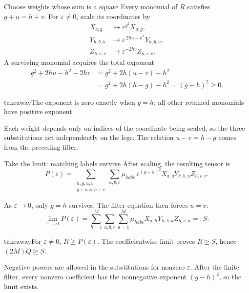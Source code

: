 \documentclass[aspectratio=169,11pt]{beamer}
\newcommand{\degen}{\unrhd}
\newcommand{\source}[1]{\vfill\par{\fontsize{7.5}{9}\selectfont\color{muted}#1\par}}
\newcommand{\takeaway}[1]{\begin{beamercolorbox}[sep=0.65em,wd=\linewidth]{takeaway}#1\end{beamercolorbox}}
\begin{document}
\begin{frame}{Choose weights whose sum is a square}
  Every monomial of $R$ satisfies $g+u=h+v$.
  For $\varepsilon\ne0$, scale its coordinates by
  \[
  \begin{aligned}
    X_{a,g}&\longmapsto\varepsilon^{g^2}X_{a,g},\\
    Y_{h,b,u}&\longmapsto\varepsilon^{\,2hu-h^2}Y_{h,b,u},\\
    Z_{h,c,v}&\longmapsto\varepsilon^{-2hv}Z_{h,c,v}.
  \end{aligned}
  \]
  A surviving monomial acquires the total exponent
  \[
  \begin{aligned}
    g^2+2hu-h^2-2hv
      &=g^2+2h(u-v)-h^2\\
      &=g^2+2h(h-g)-h^2=(g-h)^2\ge0.
  \end{aligned}
  \]
  \takeaway{The exponent is zero exactly when $g=h$;
    all other retained monomials have positive exponent.}
  \source{Each weight depends only on indices of the coordinate being scaled,
  so the three substitutions act independently on the legs.
  The relation $u-v=h-g$ comes from the preceding filter.}
\end{frame}

\begin{frame}{Take the limit: matching labels survive}
  After scaling, the resulting tensor is
  \[
    P(\varepsilon)=
      \sum_{\substack{h,g,u,v\\g+u=h+v}}\sum_{a,b,c}
      \mu_{habc}\,\varepsilon^{(g-h)^2}
      X_{a,g}Y_{h,b,u}Z_{h,c,v}.
  \]
  \par\medskip
  As $\varepsilon\to0$, only $g=h$ survives. The filter equation then forces $u=v$:
  \[
    \lim_{\varepsilon\to0}P(\varepsilon)
      =\sum_{h=1}^{M}\sum_{a,b,c}\sum_{u=1}^{M}
        \mu_{habc}X_{a,h}Y_{h,b,u}Z_{h,c,u}
      =:S.
  \]
  \takeaway{For $\varepsilon\ne0$, $R\ge P(\varepsilon)$.
    The coefficientwise limit proves $R\degen S$, hence $(2M)Q\degen S$.}
  \source{Negative powers are allowed in the substitutions for nonzero
  $\varepsilon$. After the finite filter, every nonzero coefficient has
  the nonnegative exponent $(g-h)^2$, so the limit exists.}
\end{frame}
\end{document}
